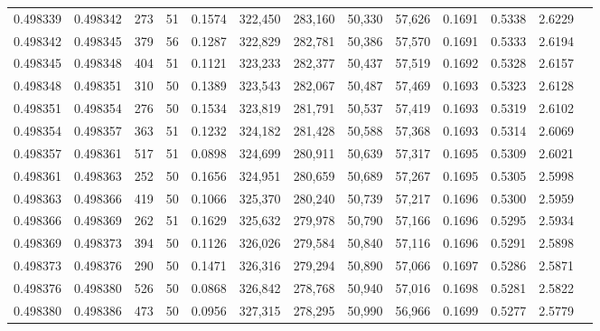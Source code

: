 \begin{tabular}{rrrrrrrrrrrrr}
0.498339 & 0.498342 & 273 &  51 &                                     0.1574 & 322,450 & 283,160 &  50,330 &  57,626 & 0.1691 & 0.5338 & 2.6229 \\
0.498342 & 0.498345 & 379 &  56 &                                     0.1287 & 322,829 & 282,781 &  50,386 &  57,570 & 0.1691 & 0.5333 & 2.6194 \\
0.498345 & 0.498348 & 404 &  51 &                                     0.1121 & 323,233 & 282,377 &  50,437 &  57,519 & 0.1692 & 0.5328 & 2.6157 \\
0.498348 & 0.498351 & 310 &  50 &                                     0.1389 & 323,543 & 282,067 &  50,487 &  57,469 & 0.1693 & 0.5323 & 2.6128 \\
0.498351 & 0.498354 & 276 &  50 &                                     0.1534 & 323,819 & 281,791 &  50,537 &  57,419 & 0.1693 & 0.5319 & 2.6102 \\
0.498354 & 0.498357 & 363 &  51 &                                     0.1232 & 324,182 & 281,428 &  50,588 &  57,368 & 0.1693 & 0.5314 & 2.6069 \\
0.498357 & 0.498361 & 517 &  51 &                                     0.0898 & 324,699 & 280,911 &  50,639 &  57,317 & 0.1695 & 0.5309 & 2.6021 \\
0.498361 & 0.498363 & 252 &  50 &                                     0.1656 & 324,951 & 280,659 &  50,689 &  57,267 & 0.1695 & 0.5305 & 2.5998 \\
0.498363 & 0.498366 & 419 &  50 &                                     0.1066 & 325,370 & 280,240 &  50,739 &  57,217 & 0.1696 & 0.5300 & 2.5959 \\
0.498366 & 0.498369 & 262 &  51 &                                     0.1629 & 325,632 & 279,978 &  50,790 &  57,166 & 0.1696 & 0.5295 & 2.5934 \\
0.498369 & 0.498373 & 394 &  50 &                                     0.1126 & 326,026 & 279,584 &  50,840 &  57,116 & 0.1696 & 0.5291 & 2.5898 \\
0.498373 & 0.498376 & 290 &  50 &                                     0.1471 & 326,316 & 279,294 &  50,890 &  57,066 & 0.1697 & 0.5286 & 2.5871 \\
0.498376 & 0.498380 & 526 &  50 &                                     0.0868 & 326,842 & 278,768 &  50,940 &  57,016 & 0.1698 & 0.5281 & 2.5822 \\
0.498380 & 0.498386 & 473 &  50 &                                     0.0956 & 327,315 & 278,295 &  50,990 &  56,966 & 0.1699 & 0.5277 & 2.5779 \\

\end{tabular}
